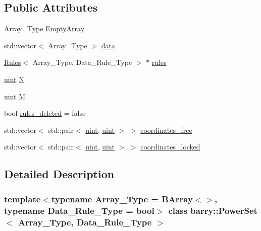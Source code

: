 \subsection*{Public Attributes}
\begin{DoxyCompactItemize}
\item 
Array\+\_\+\+Type \hyperlink{classbarry_1_1_power_set_a7709618ce9c3d9346499c7b23b91392a}{Empty\+Array}
\item 
std\+::vector$<$ Array\+\_\+\+Type $>$ \hyperlink{classbarry_1_1_power_set_a90fecd17a9d1f36153c07bc929b1630f}{data}
\item 
\hyperlink{classbarry_1_1_rules}{Rules}$<$ Array\+\_\+\+Type, Data\+\_\+\+Rule\+\_\+\+Type $>$ $\ast$ \hyperlink{classbarry_1_1_power_set_ae8eee09092e96fbefde320ba89fdcbfc}{rules}
\item 
\hyperlink{namespacebarry_a11dfc53ddb4672278319aa04f1e09a6c}{uint} \hyperlink{classbarry_1_1_power_set_adea0f6434b17b3fc391475a11db00c2f}{N}
\item 
\hyperlink{namespacebarry_a11dfc53ddb4672278319aa04f1e09a6c}{uint} \hyperlink{classbarry_1_1_power_set_ae64182a21f9969a2c9fdf73ab23a6c5e}{M}
\item 
bool \hyperlink{classbarry_1_1_power_set_aac868bcdb4a7f6c17d35aa29cf8e5028}{rules\+\_\+deleted} = false
\item 
std\+::vector$<$ std\+::pair$<$ \hyperlink{namespacebarry_a11dfc53ddb4672278319aa04f1e09a6c}{uint}, \hyperlink{namespacebarry_a11dfc53ddb4672278319aa04f1e09a6c}{uint} $>$ $>$ \hyperlink{classbarry_1_1_power_set_a2bc42422f23546d55fef96f053c0c4ea}{coordinates\+\_\+free}
\item 
std\+::vector$<$ std\+::pair$<$ \hyperlink{namespacebarry_a11dfc53ddb4672278319aa04f1e09a6c}{uint}, \hyperlink{namespacebarry_a11dfc53ddb4672278319aa04f1e09a6c}{uint} $>$ $>$ \hyperlink{classbarry_1_1_power_set_a46fa867445a84be388ee62602922980a}{coordinates\+\_\+locked}
\end{DoxyCompactItemize}


\subsection{Detailed Description}
\subsubsection*{template$<$typename Array\+\_\+\+Type = B\+Array$<$$>$, typename Data\+\_\+\+Rule\+\_\+\+Type = bool$>$\newline
class barry\+::\+Power\+Set$<$ Array\+\_\+\+Type, Data\+\_\+\+Rule\+\_\+\+Type $>$}

